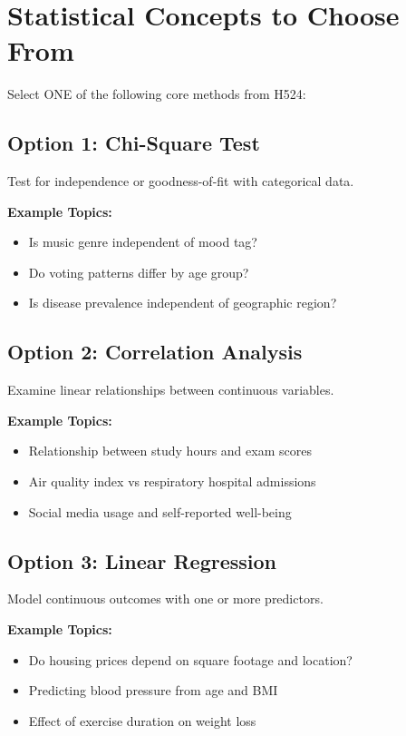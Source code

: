 \documentclass[11pt]{article}
\begin{document}
\section{Statistical Concepts to Choose From}

Select ONE of the following core methods from H524:

\subsection{Option 1: Chi-Square Test}
Test for independence or goodness-of-fit with categorical data.

\textbf{Example Topics:}
\begin{itemize}
\item Is music genre independent of mood tag?
\item Do voting patterns differ by age group?
\item Is disease prevalence independent of geographic region?
\end{itemize}

\subsection{Option 2: Correlation Analysis}
Examine linear relationships between continuous variables.

\textbf{Example Topics:}
\begin{itemize}
\item Relationship between study hours and exam scores
\item Air quality index vs respiratory hospital admissions
\item Social media usage and self-reported well-being
\end{itemize}

\subsection{Option 3: Linear Regression}
Model continuous outcomes with one or more predictors.

\textbf{Example Topics:}
\begin{itemize}
\item Do housing prices depend on square footage and location?
\item Predicting blood pressure from age and BMI
\item Effect of exercise duration on weight loss
\end{itemize}
\end{document}
